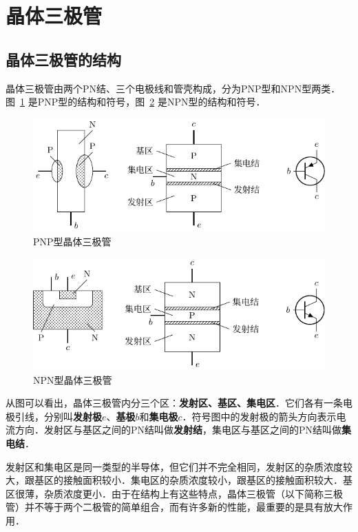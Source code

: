 \section{晶体三极管}

\subsection{晶体三极管的结构}

晶体三极管由两个PN结、三个电极线和管壳构成，分为PNP型和NPN型两类．
图~\ref{fig_B_8-28} 是PNP型的结构和符号，图~\ref{fig_B_8-29} 是NPN型的结构和符号．
\begin{figure}[htbp]
    \centering
    \includegraphics{fig/B/8-28.pdf}
    \caption{PNP型晶体三极管}\label{fig_B_8-28}
\end{figure}

\begin{figure}[htbp]
    \centering
    \includegraphics{fig/B/8-29.pdf}
    \caption{NPN型晶体三极管}\label{fig_B_8-29}
\end{figure}

从图可以看出，晶体三极管内分三个区：\textbf{发射区、基区、集电区}．它们各有一条电极引线，分别叫\textbf{发射极$e$}、\textbf{基极$b$}和\textbf{集电极$c$}．符号图中的发射极的箭头方向表示电流方向．发射区与基区之间的PN结叫做\textbf{发射结}，集电区与基区之间的PN结叫做\textbf{集电结}．

发射区和集电区是同一类型的半导体，但它们并不完全相同，发射区的杂质浓度较大，跟基区的接触面积较小．集电区的杂质浓度较小，跟基区的接触面积较大．基区很薄，杂质浓度更小．由于在结构上有这些特点，晶体三极管（以下简称三极管）并不等于两个二极管的简单组合，而有许多新的性能，最重要的是具有放大作用．

